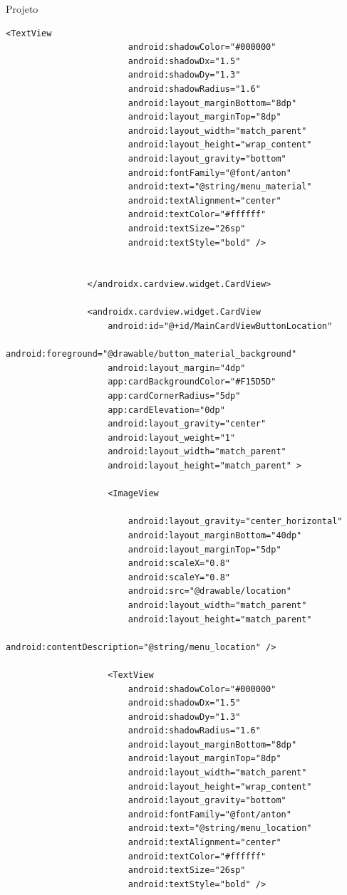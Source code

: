 \documentclass[
	12pt,				%
	openright,			%
	twoside,			%
	a4paper,			%
	english,			%
	french,				%
	spanish,			%
	brazil				%
	]{abntex2}
\begin{document}
\begin{chapter}{Projeto}
\begin{lstlisting}[numbers=none,
basicstyle=\small,
caption={Fragment Main.xml},
title={Fragment Main.xml},
xleftmargin=4pt,
label={fragment_main.xml}]
                    <TextView
                        android:shadowColor="#000000"
                        android:shadowDx="1.5"
                        android:shadowDy="1.3"
                        android:shadowRadius="1.6"
                        android:layout_marginBottom="8dp"
                        android:layout_marginTop="8dp"
                        android:layout_width="match_parent"
                        android:layout_height="wrap_content"
                        android:layout_gravity="bottom"
                        android:fontFamily="@font/anton"
                        android:text="@string/menu_material"
                        android:textAlignment="center"
                        android:textColor="#ffffff"
                        android:textSize="26sp"
                        android:textStyle="bold" />


                </androidx.cardview.widget.CardView>

                <androidx.cardview.widget.CardView
                    android:id="@+id/MainCardViewButtonLocation"
                    android:foreground="@drawable/button_material_background"
                    android:layout_margin="4dp"
                    app:cardBackgroundColor="#F15D5D"
                    app:cardCornerRadius="5dp"
                    app:cardElevation="0dp"
                    android:layout_gravity="center"
                    android:layout_weight="1"
                    android:layout_width="match_parent"
                    android:layout_height="match_parent" >

                    <ImageView

                        android:layout_gravity="center_horizontal"
                        android:layout_marginBottom="40dp"
                        android:layout_marginTop="5dp"
                        android:scaleX="0.8"
                        android:scaleY="0.8"
                        android:src="@drawable/location"
                        android:layout_width="match_parent"
                        android:layout_height="match_parent"
                        android:contentDescription="@string/menu_location" />

                    <TextView
                        android:shadowColor="#000000"
                        android:shadowDx="1.5"
                        android:shadowDy="1.3"
                        android:shadowRadius="1.6"
                        android:layout_marginBottom="8dp"
                        android:layout_marginTop="8dp"
                        android:layout_width="match_parent"
                        android:layout_height="wrap_content"
                        android:layout_gravity="bottom"
                        android:fontFamily="@font/anton"
                        android:text="@string/menu_location"
                        android:textAlignment="center"
                        android:textColor="#ffffff"
                        android:textSize="26sp"
                        android:textStyle="bold" />


\end{lstlisting}
\end{chapter}
\end{document}

